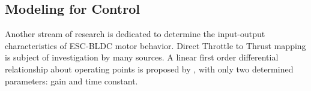 \subsection{Modeling for Control}
Another stream of research is dedicated to determine the input-output characteristics of ESC-BLDC motor behavior. 
\newline
Direct Throttle to Thrust mapping is subject of investigation by many sources. A linear first order differential relationship about operating points is proposed by \cite{Yoon2015}, with only two determined parameters: gain and time constant. 